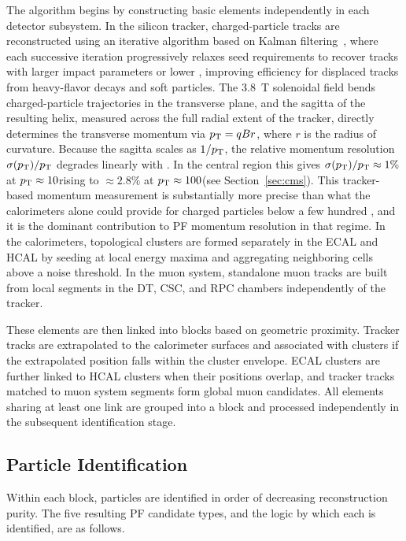 The algorithm begins by constructing basic elements independently in each detector subsystem. In the silicon tracker, charged-particle tracks are reconstructed using an iterative algorithm based on Kalman filtering~\cite{Fruhwirth:1987fm}, where each successive iteration progressively relaxes seed requirements to recover tracks with larger impact parameters or lower \pT, improving efficiency for displaced tracks from heavy-flavor decays and soft particles. The 3.8~T solenoidal field bends charged-particle trajectories in the transverse plane, and the sagitta of the resulting helix, measured across the full radial extent of the tracker, directly determines the transverse momentum via $p_{\mathrm{T}} = qBr$, where $r$ is the radius of curvature. Because the sagitta scales as $1/p_{\mathrm{T}}$, the relative momentum resolution $\sigma(p_{\mathrm{T}})/p_{\mathrm{T}}$ degrades linearly with \pT. In the central region this gives $\sigma(p_{\mathrm{T}})/p_{\mathrm{T}} \approx 1\%$ at $p_{\mathrm{T}} \approx 10$\GeV rising to $\approx 2.8\%$ at $p_{\mathrm{T}} \approx 100$\GeV (see Section~\ref{sec:cms}). This tracker-based momentum measurement is substantially more precise than what the calorimeters alone could provide for charged particles below a few hundred \GeV, and it is the dominant contribution to PF momentum resolution in that regime. In the calorimeters, topological clusters are formed separately in the ECAL and HCAL by seeding at local energy maxima and aggregating neighboring cells above a noise threshold. In the muon system, standalone muon tracks are built from local segments in the DT, CSC, and RPC chambers independently of the tracker.

These elements are then linked into blocks based on geometric proximity. Tracker tracks are extrapolated to the calorimeter surfaces and associated with clusters if the extrapolated position falls within the cluster envelope. ECAL clusters are further linked to HCAL clusters when their positions overlap, and tracker tracks matched to muon system segments form global muon candidates. All elements sharing at least one link are grouped into a block and processed independently in the subsequent identification stage.

\subsection*{Particle Identification}

Within each block, particles are identified in order of decreasing reconstruction purity. The five resulting PF candidate types, and the logic by which each is identified, are as follows.


